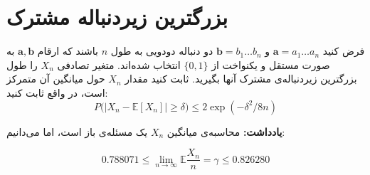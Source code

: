 \section{بزرگترین زیردنباله مشترک}
فرض کنید 
$\mathbf{a}=a_1\dots a_n$
و 
$\mathbf{b}=b_1 \dots b_n$
دو دنباله دودویی به طول
$n$
باشند که ارقام
$\mathbf{a}, \mathbf{b}$
 به صورت مستقل و یکنواخت از 
$\{0,1\}$
انتخاب شده‌اند. متغیر تصادفی 
$X_n$
را طول بزرگترین زیردنباله‌ی مشترک آنها بگیرید.  ثابت کنید مقدار $X_n$ حول میانگین آن متمرکز است، در واقع ثابت کنید:
$$P\Big(\left|X_{n}-\mathbb{E}\left[X_{n}\right]\right| \geq \delta \Big) \leq 2 \exp \left(-\delta^{2} / 8 n\right)$$

\textbf{
یادداشت:}
محاسبه‌ی میانگین $X_n$ یک مسئله‌ی باز است، اما می‌دانیم:

$$0.788071 \leq \lim_{n\to\infty}\mathbb{E} \frac{X_n}{n}= \gamma \leq 0.826280$$